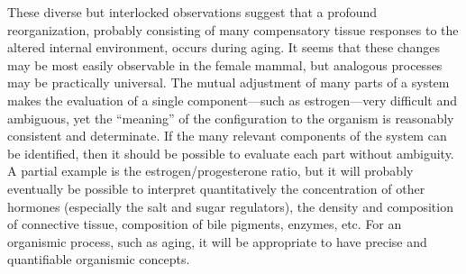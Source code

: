 These diverse but interlocked observations suggest that a profound reorganization, probably consisting of many compensatory tissue responses to the altered internal environment, occurs during aging. It seems that these changes may be most easily observable in the female mammal, but analogous processes may be practically universal. The mutual adjustment of many parts of a system makes the evaluation of a single component---such as estrogen---very difficult and ambiguous, yet the ``meaning'' of the configuration to the organism is reasonably consistent and determinate. If the many relevant components of the system can be identified, then it should be possible to evaluate each part without ambiguity. A partial example is the estrogen/progesterone ratio, but it will probably eventually be possible to interpret quantitatively the concentration of other hormones (especially the salt and sugar regulators), the density and composition of connective tissue, composition of bile pigments, enzymes, etc. For an organismic process, such as aging, it will be appropriate to have precise and quantifiable organismic concepts.